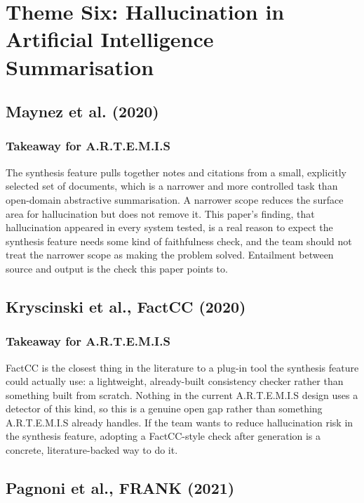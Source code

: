 \documentclass[11pt,a4paper]{report}
\newcommand{\artemis}{A.R.T.E.M.I.S}
\begin{document}
\section{Theme Six: Hallucination in Artificial Intelligence
Summarisation}

\subsection{Maynez et al. (2020)}

\subsubsection{Takeaway for \artemis{}}

The synthesis feature pulls together notes and citations from a small,
explicitly selected set of documents, which is a narrower and more
controlled task than open-domain abstractive summarisation. A narrower
scope reduces the surface area for hallucination but does not remove it.
This paper's finding, that hallucination appeared in every system
tested, is a real reason to expect the synthesis feature needs some kind
of faithfulness check, and the team should not treat the narrower scope
as making the problem solved. Entailment between source and output is
the check this paper points to.

\subsection{Kryscinski et al., FactCC (2020)}

\subsubsection{Takeaway for \artemis{}}

FactCC is the closest thing in the literature to a plug-in tool the
synthesis feature could actually use: a lightweight, already-built
consistency checker rather than something built from scratch. Nothing
in the current \artemis{} design uses a detector of this kind, so this
is a genuine open gap rather than something \artemis{} already handles.
If the team wants to reduce hallucination risk in the synthesis feature,
adopting a FactCC-style check after generation is a concrete,
literature-backed way to do it.

\subsection{Pagnoni et al., FRANK (2021)}
\end{document}
